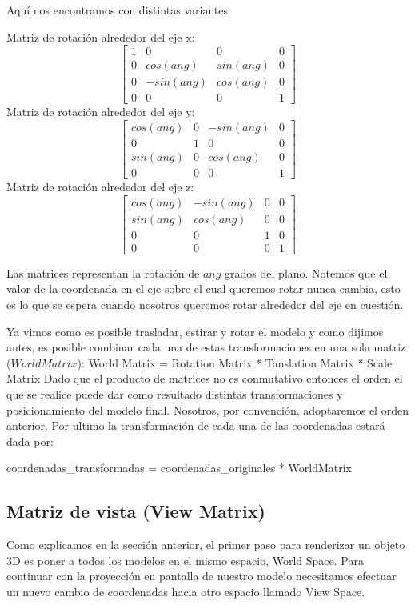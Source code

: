 \documentclass[a4paper]{article}
\begin{document}
Aquí nos encontramos con distintas variantes 
 
Matriz de rotación alrededor del eje x:
\[
\begin{bmatrix}
1 & 0 & 0 & 0 \\
0 & cos(ang) & sin(ang) & 0 \\
0 & -sin(ang) & cos(ang) & 0 \\
0 & 0 & 0 & 1  
\end{bmatrix}
\]
Matriz de rotación alrededor del eje y:
\[
\begin{bmatrix}
cos(ang) & 0 & -sin(ang) & 0 \\
0 & 1 & 0 & 0 \\
sin(ang) & 0 & cos(ang) & 0 \\
0 & 0 & 0 & 1  
\end{bmatrix}
\]
Matriz de rotación alrededor del eje z:
\[
\begin{bmatrix}
cos(ang) & -sin(ang) & 0 & 0 \\
sin(ang) & cos(ang) & 0 & 0 \\
0 & 0 & 1 & 0 \\
0 & 0 & 0 & 1  
\end{bmatrix}
\]


Las  matrices representan  la rotación de $ang$ grados del plano. Notemos que el valor de la coordenada en el eje sobre el cual queremos rotar nunca cambia, esto es lo que se espera cuando nosotros queremos rotar alrededor del eje en cuestión. 

\par Ya vimos como es posible trasladar, estirar y rotar el modelo y como dijimos antes, es posible combinar cada una de estas transformaciones en una sola matriz ($World Matrix$): \newline
World Matrix = Rotation Matrix * Tanslation Matrix * Scale Matrix\newline  \newline
 Dado que el producto de matrices no es conmutativo entonces el orden el que se realice puede dar como resultado distintas transformaciones y posicionamiento del modelo final. Nosotros, por convención, adoptaremos el orden anterior.
Por ultimo la transformación de cada una de las coordenadas estará dada por: \newline

coordenadas\_transformadas = coordenadas\_originales * WorldMatrix 


\subsection{Matriz de vista (View Matrix)}
Como explicamos en la sección anterior, el primer paso para  renderizar un objeto 3D  es poner a todos los modelos en el mismo espacio, World Space. Para continuar con la proyección en pantalla de nuestro modelo necesitamos efectuar un nuevo cambio de coordenadas hacia otro espacio llamado View Space.
\end{document}
